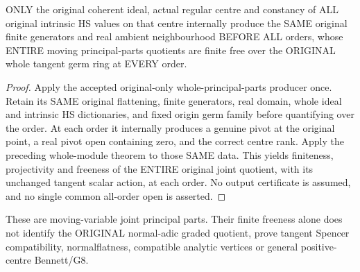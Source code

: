 \begin{theorem}
\label{hir:actual-hs-constant-centre-all-order-principal-parts-free}
ONLY the original coherent ideal, actual regular centre and constancy
of ALL original intrinsic HS values on that centre internally produce
the SAME original finite generators and real ambient neighbourhood
BEFORE ALL orders, whose ENTIRE moving principal-parts quotients are
finite free over the ORIGINAL whole tangent germ ring at EVERY order.
\leanok
\end{theorem}
\begin{proof}
Apply the accepted original-only whole-principal-parts producer once.
Retain its SAME original flattening, finite generators, real domain,
whole ideal and intrinsic HS dictionaries, and fixed origin germ
family before quantifying over the order. At each order it internally
produces a genuine pivot at the original point, a real pivot open
containing zero, and the correct centre rank. Apply the preceding
whole-module theorem to those SAME data. This yields finiteness,
projectivity and freeness of the ENTIRE original joint quotient, with
its unchanged tangent scalar action, at each order. No output
certificate is assumed, and no single common all-order open is asserted.
\end{proof}

These are moving-variable joint principal parts. Their finite freeness
alone does not identify the ORIGINAL normal-adic graded quotient,
prove tangent Spencer compatibility, normalflatness, compatible
analytic vertices or general positive-centre Bennett/G8.
